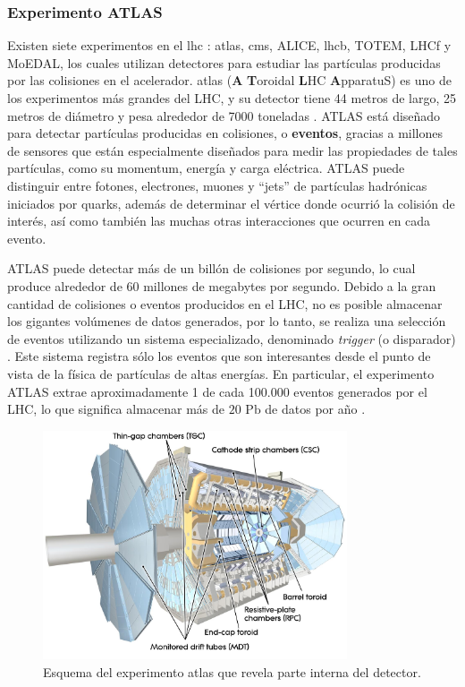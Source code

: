\subsubsection{Experimento ATLAS}
Existen siete experimentos en el \acrshort{lhc} \cite{ExpWP}: \acrshort{atlas}, \acrshort{cms}, ALICE, \acrshort{lhcb}, TOTEM, LHCf y MoEDAL, los cuales utilizan detectores para estudiar las partículas producidas por las colisiones en el acelerador. 
%
\acrshort{atlas} ({\bf A} {\bf T}oroidal {\bf L}HC {\bf A}pparatuS) es uno de los experimentos más grandes del LHC, y su detector tiene 44 metros de largo, 25 metros de diámetro y pesa alrededor de 7000 toneladas \cite{ATLASWP}. 
%
ATLAS  está diseñado para detectar partículas producidas en colisiones, o {\bf eventos}, gracias a millones de sensores que están especialmente diseñados para medir las propiedades de tales partículas, como su momentum, energía y carga eléctrica. 
%
ATLAS puede distinguir entre fotones, electrones, muones y ``jets'' de partículas hadrónicas iniciados por quarks, además de determinar el vértice donde ocurrió la colisión de interés, así como también las muchas otras interacciones que ocurren en cada evento.  


ATLAS puede detectar más de un billón de colisiones por segundo, lo cual produce alrededor de 60 millones de megabytes por segundo. 
%
Debido a la gran cantidad de colisiones o eventos producidos en el LHC, no es posible almacenar los gigantes volúmenes de datos generados, por lo tanto, se realiza una selección de eventos utilizando un sistema especializado, denominado \emph{trigger} (o disparador) \cite{Armstrong2004}. 
%
Este sistema registra sólo los eventos que son interesantes desde el punto de vista de la física de partículas de altas energías. 
%
En particular, el experimento ATLAS extrae aproximadamente 1 de cada 100.000 eventos generados por el LHC, lo que significa almacenar más de $20 \text{ Pb}$ de datos por año \cite{Radovic2018}. 


\begin{figure}[]
  \centering
  \includegraphics[width=9cm]{figures/image2.jpg}
  \caption[Esquema del experimento ATLAS.]{Esquema del experimento \acrshort{atlas} que revela parte interna del detector.
  } \label{fig:atlasdet}
\end{figure}

